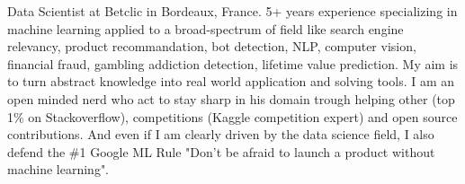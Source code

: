 

\begin{cvparagraph}

Data Scientist at Betclic in Bordeaux, France. 5+ years experience specializing in machine learning applied to a broad-spectrum of field like search engine relevancy, product recommandation, bot detection, NLP, computer vision, financial fraud, gambling addiction detection, lifetime value prediction. My aim is to turn abstract knowledge into real world application and solving tools. I am an open minded nerd who act to stay sharp in his domain trough helping other (top 1\% on Stackoverflow), competitions (Kaggle competition expert) and open source contributions. And even if I am clearly driven by the data science field, I also defend the \#1 Google ML Rule "Don’t be afraid to launch a product without machine learning".
\end{cvparagraph}
